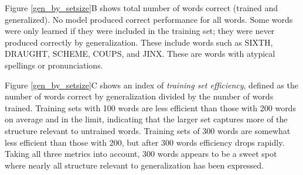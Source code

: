 \documentclass[10pt,letterpaper]{article}
\newcommand{\exword}[1]{\MakeUppercase{#1}}
\begin{document}
Figure \ref{gen_by_setsize}B shows total number of words correct (trained and generalized). No model produced correct performance for all words. Some words were only learned if they were included in the training set; they were never produced correctly by generalization. These include words such as \exword{sixth}, \exword{draught}, \exword{scheme}, \exword{coups}, and \exword{jinx}. These are words with atypical spellings or pronunciations. 

Figure \ref{gen_by_setsize}C shows an index of \emph{training set efficiency}, defined as the number of words correct by generalization divided by the number of words trained. Training sets with 100 words are less efficient than those with 200 words on average and in the limit, indicating that the larger set captures more of the structure relevant to untrained words. Training sets of 300 words are somewhat less efficient than those with 200, but after 300 words efficiency drops rapidly. Taking all three metrics into account, 300 words appears to be a sweet spot where nearly all structure relevant to generalization has been expressed. 
\end{document}
